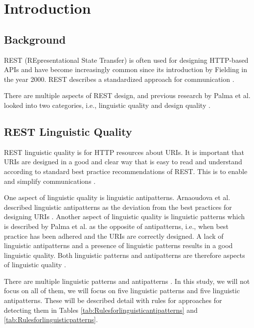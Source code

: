 \section{Introduction}

\subsection{Background}
REST (REpresentational State Transfer) is often used for designing HTTP-based APIs and have become increasingly common since its introduction by Fielding in the year 2000. REST describes a standardized approach for communication \cite{restdissertation}.

There are multiple aspects of REST design, and previous research by Palma et al. looked into two categories, i.e., linguistic quality and design quality \cite{design}\cite{linguistic}.

\subsection{REST Linguistic Quality}

REST linguistic quality is for HTTP resources about URIs. It is important that URIs are designed in a good and clear way that is easy to read and understand according to standard best practice recommendations of REST. This is to enable and simplify communications \cite{restdissertation}\cite{linguistic}. 


One aspect of linguistic quality is linguistic antipatterns. Arnaoudova et al. described linguistic antipatterns as the deviation from the best practices for designing URIs \cite{arnaoudova}. Another aspect of linguistic quality is linguistic patterns which is described by Palma et al. as the opposite of antipatterns, i.e., when best practice has been adhered and the URIs are correctly designed. A lack of linguistic antipatterns and a presence of linguistic patterns results in a good linguistic quality. Both linguistic patterns and antipatterns are therefore aspects of linguistic quality \cite{linguistic}.

There are multiple linguistic patterns and antipatterns \cite{linguistic}. In this study, we will not focus on all of them, we will focus on five linguistic patterns and five linguistic antipatterns. These will be described detail with rules for approaches for detecting them in Tables \ref{tab:Rulesforlinguisticantipatterns} and \ref{tab:Rulesforlinguisticpatterns}. %

